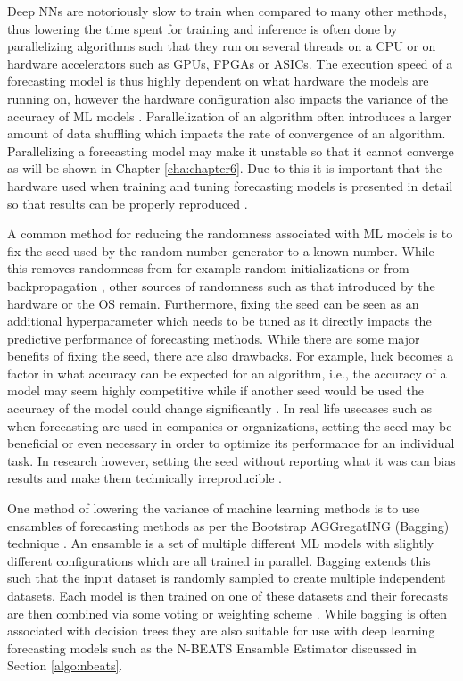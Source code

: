 Deep NNs are notoriously slow to train when compared to many other methods, thus lowering the time spent for training and inference is often done by parallelizing algorithms such that they run on several threads on a CPU or on hardware accelerators such as GPUs, FPGAs or ASICs. The execution speed of a forecasting model is thus highly dependent on what hardware the models are running on, however the hardware configuration also impacts the variance of the accuracy of ML models \cite{zhuang2021randomness}. Parallelization of an algorithm often introduces a larger amount of data shuffling which impacts the rate of convergence of an algorithm. Parallelizing a forecasting model may make it unstable so that it cannot converge as will be shown in Chapter \ref{cha:chapter6}. Due to this it is important that the hardware used when training and tuning forecasting models is presented in detail so that results can be properly reproduced \cite{pineau2020improving}.

A common method for reducing the randomness associated with ML models is to fix the seed used by the random number generator to a known number. While this removes randomness from for example random initializations or from backpropagation \cite{beam2020challenges}, other sources of randomness such as that introduced by the hardware or the OS remain. Furthermore, fixing the seed can be seen as an additional hyperparameter which needs to be tuned as it directly impacts the predictive performance of forecasting methods. While there are some major benefits of fixing the seed, there are also drawbacks. For example, luck becomes a factor in what accuracy can be expected for an algorithm, i.e., the accuracy of a model may seem highly competitive while if another seed would be used the accuracy of the model could change significantly \cite{beam2020challenges}. In real life usecases such as when forecasting are used in companies or organizations, setting the seed may be beneficial or even necessary in order to optimize its performance for an individual task. In research however, setting the seed without reporting what it was can bias results and make them technically irreproducible \cite{beam2020challenges,pineau2020improving,bouthillier2021accounting}.

One method of lowering the variance of machine learning methods is to use ensambles of forecasting methods as per the Bootstrap AGGregatING (Bagging) technique \cite{buhlmann2002analyzing}. An ensamble is a set of multiple different ML models with slightly different configurations which are all trained in parallel. Bagging extends this such that the input dataset is randomly sampled to create multiple independent datasets. Each model is then trained on one of these datasets and their forecasts are then combined via some voting or weighting scheme \cite{buhlmann2002analyzing}. While bagging is often associated with decision trees they are also suitable for use with deep learning forecasting models such as the N-BEATS Ensamble Estimator discussed in Section \ref{algo:nbeats}.

